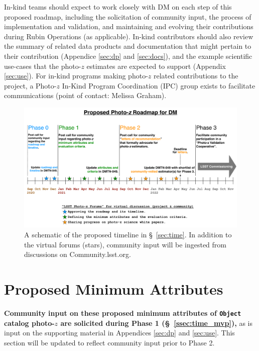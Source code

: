 \documentclass[DM,lsstdraft,toc]{lsstdoc}
\begin{document}
In-kind teams should expect to work closely with DM on each step of this proposed roadmap, including the solicitation of community input, the process of implementation and validation, and maintaining and evolving their contributions during Rubin Operations (as applicable).
In-kind contributors should also review the summary of related data products and documentation that might pertain to their contribution (Appendice \ref{sec:dp} and  \ref{sec:docs}), and the example scientific use-cases that the photo-$z$ estimates are expected to support (Appendix \ref{sec:use}).
For in-kind programs making photo-$z$ related contributions to the project, a Photo-$z$ In-Kind Program Coordination (IPC) group exists to facilitate communications (point of contact: Melissa Graham).

\begin{figure}
\begin{center}
\includegraphics[width=17cm]{DMTN049_timeline.pdf}
\caption{A schematic of the proposed timeline in \S~\ref{sec:time}. In addition to the virtual forums (stars), community input will be ingested from discussions on Community.lsst.org. \label{fig:timeline}}
\end{center}
\end{figure}


\clearpage
\section{Proposed Minimum Attributes}\label{sec:mvp}

\textbf{Community input on these proposed minimum attributes of {\tt Object} catalog photo-$z$ are solicited during Phase 1 (\S~\ref{ssec:time_mvp}),} as is input on the supporting material in Appendices \ref{sec:dp} and \ref{sec:use}.
This section will be updated to reflect community input prior to Phase 2.
\end{document}
